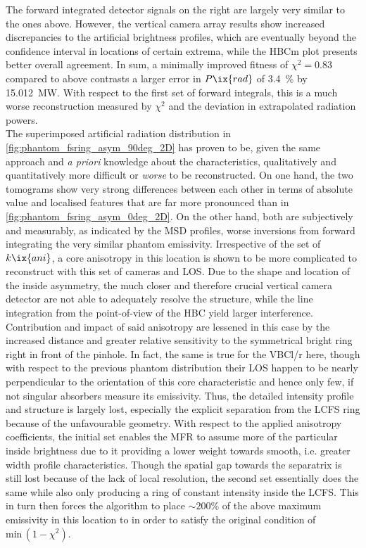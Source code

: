                 The forward integrated detector signals on the right are largely very similar to the ones above. However, the vertical camera array results show increased discrepancies to the artificial brightness profiles, which are eventually beyond the confidence interval in locations of certain extrema, while the HBCm plot presents better overall agreement. In sum, a minimally improved fitness of $\chi^{2}=$\SI{0.83}{\arbitraryunit} compared to above contrasts a larger error in $P\ix{rad}$ of \SI{3.4}{\percent} by \SI{15.012}{\mega\watt}. With respect to the first set of forward integrals, this is a much worse reconstruction measured by $\chi^{2}$ and the deviation in extrapolated radiation powers.\\%
                The superimposed artificial radiation distribution in \cref{fig:phantom_fsring_asym_90deg_2D} has proven to be, given the same approach and \textit{a priori} knowledge about the characteristics, qualitatively and quantitatively more difficult or \textit{worse} to be reconstructed. On one hand, the two tomograms show very strong differences between each other in terms of absolute value and localised features that are far more pronounced than in \cref{fig:phantom_fsring_asym_0deg_2D}. On the other hand, both are subjectively and measurably, as indicated by the MSD profiles, worse inversions from forward integrating the very similar phantom emissivity. Irrespective of the set of $k\ix{ani}$, a core anisotropy in this location is shown to be more complicated to reconstruct with this set of cameras and LOS. Due to the shape and location of the inside asymmetry, the much closer and therefore crucial vertical camera detector are not able to adequately resolve the structure, while the line integration from the point-of-view of the HBC yield larger interference. Contribution and impact of said anisotropy are lessened in this case by the increased distance and greater relative sensitivity to the symmetrical bright ring right in front of the pinhole. In fact, the same is true for the VBCl/r here, though with respect to the previous phantom distribution their LOS happen to be nearly perpendicular to the orientation of this core characteristic and hence only few, if not singular absorbers measure its emissivity. Thus, the detailed intensity profile and structure is largely lost, especially the explicit separation from the LCFS ring because of the unfavourable geometry. With respect to the applied anisotropy coefficients, the initial set enables the MFR to assume more of the particular inside brightness due to it providing a lower weight towards smooth, i.e. greater width profile characteristics. Though the spatial gap towards the separatrix is still lost because of the lack of local resolution, the second set essentially does the same while also only producing a ring of constant intensity inside the LCFS. This in turn then forces the algorithm to place $\sim200\%$ of the above maximum emissivity in this location to in order to satisfy the original condition of $\text{min}\,\left(1-\chi^{2}\right)$.\\%
